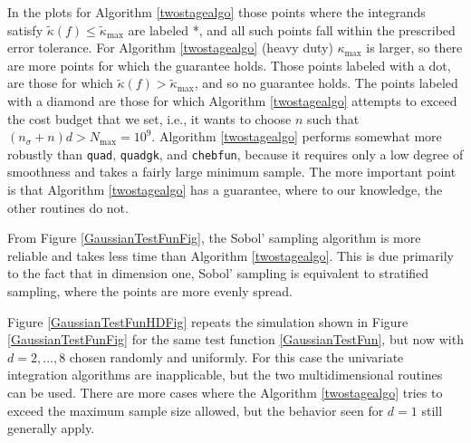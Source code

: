\documentclass[graybox]{svmult}
\newcommand{\tkappa}{\tilde{\kappa}}
\begin{document}
In the plots for Algorithm \ref{twostagealgo} those points where the integrands satisfy $\tkappa(f) \le \tkappa_{\max}$ are labeled *, and all such points fall within the prescribed error tolerance.  For Algorithm \ref{twostagealgo} (heavy duty) $\kappa_{\max}$ is larger, so there are more points for which the guarantee holds.  Those points labeled with a dot, are those for which $\tkappa(f) > \tkappa_{\max}$, and so no guarantee holds. The points labeled with a diamond are those for which Algorithm \ref{twostagealgo} attempts to exceed the cost budget that we set, i.e., it wants to choose $n$ such that $(n_{\sigma}+n)d > N_{\max}=10^9$. Algorithm \ref{twostagealgo} performs somewhat more robustly than {\tt quad}, {\tt quadgk}, and {\tt chebfun}, because it requires only a low degree of smoothness and takes a fairly large minimum sample.  The more important point is that Algorithm \ref{twostagealgo} has a guarantee, where to our knowledge, the other routines do not.

From Figure \ref{GaussianTestFunFig}, the Sobol' sampling algorithm is more reliable and takes less time than Algorithm \ref{twostagealgo}.  This is due primarily to the fact that in dimension one, Sobol' sampling is equivalent to stratified sampling, where the points are more evenly spread.

Figure \ref{GaussianTestFunHDFig} repeats the simulation shown in Figure \ref{GaussianTestFunFig} for the same test function \eqref{GaussianTestFun}, but now with $d=2, \ldots, 8$ chosen randomly and uniformly.  For this case the univariate integration algorithms are inapplicable, but the two multidimensional routines can be used.  There are more cases where the Algorithm \ref{twostagealgo} tries to exceed the maximum sample size allowed, but the behavior seen for $d=1$ still generally apply.  
\end{document}
